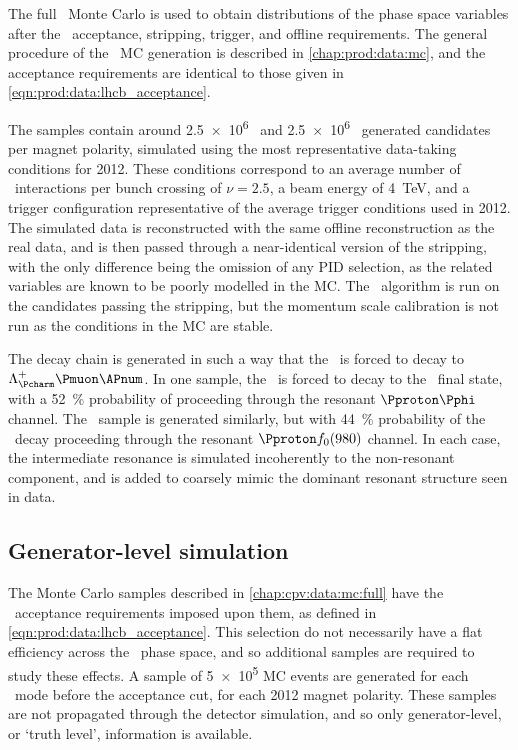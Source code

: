 The full \lhcb\ Monte Carlo is used to obtain distributions of the phase space 
variables after the \lhcb\ acceptance, stripping, trigger, and offline 
requirements.
The general procedure of the \lhcb\ \ac{MC} generation is described in 
\cref{chap:prod:data:mc}, and the acceptance requirements are identical to 
those given in \cref{eqn:prod:data:lhcb_acceptance}.

The samples contain around \num{2.5e6} \pKK\ and \num{2.5e6} \ppipi\ generated 
candidates per magnet polarity, simulated using the most representative 
data-taking conditions for 2012.
These conditions correspond to an average number of \pp\ interactions per bunch 
crossing of $\nu = 2.5$, a beam energy of \SI{4}{\TeV}, and a trigger 
configuration representative of the average trigger conditions used in 2012.
The simulated data is reconstructed with the same offline reconstruction as the 
real data, and is then passed through a near-identical version of the 
stripping, with the only difference being the omission of any \ac{PID} 
selection, as the related variables are known to be poorly modelled in the 
\ac{MC}.
The \decaytreefitter\ algorithm is run on the candidates passing the stripping, 
but the momentum scale calibration is not run as the conditions in the \ac{MC} 
are stable.

The decay chain is generated in such a way that the \PLambdab\ is forced to 
decay to $\PLambdac\Pmuon\APnum$.
In one sample, the \PLambdac\ is forced to decay to the \pKK\ final state, with 
a \SI{52}{\percent} probability of proceeding through the resonant 
$\Pproton\Pphi$ channel.
The \ppipi\ sample is generated similarly, but with \SI{44}{\percent} 
probability of the \LcToppipi\ decay proceeding through the resonant $\Pproton 
f_{0}(980)$ channel.
In each case, the intermediate resonance is simulated incoherently to the 
non-resonant component, and is added to coarsely mimic the dominant resonant 
structure seen in data.

\subsection{Generator-level simulation}
\label{chap:cpv:data:mc:gen}

The Monte Carlo samples described in \cref{chap:cpv:data:mc:full} have the 
\lhcb\ acceptance requirements imposed upon them, as defined in 
\cref{eqn:prod:data:lhcb_acceptance}.
This selection do not necessarily have a flat efficiency across the \LcTophh\ 
phase space, and so additional samples are required to study these effects.
A sample of \num{5e5} \ac{MC} events are generated for each \LcTophh\ mode 
before the acceptance cut, for each 2012 magnet polarity.
These samples are not propagated through the detector simulation, and so only 
generator-level, or `truth level', information is available.

